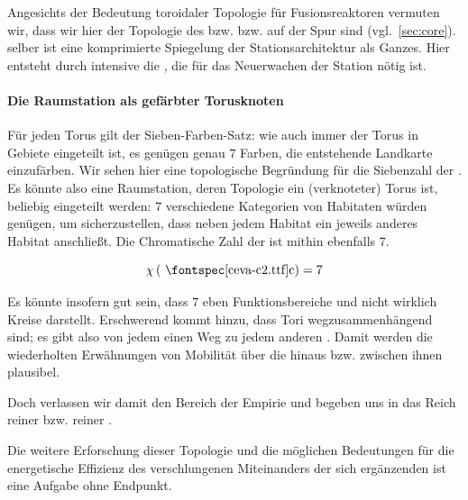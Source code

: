 Angesichts der Bedeutung toroidaler Topologie für Fusionsreaktoren vermuten wir, dass wir hier der Topologie des  bzw.  bzw.   auf der Spur sind (vgl.~\cref{sec:core}).  selber ist eine komprimierte Spiegelung der Stationsarchitektur als Ganzes. Hier entsteht durch intensive  die , die für das Neuerwachen der Station nötig ist.

\paragraph{Die Raumstation als gefärbter Torusknoten}

Für jeden Torus gilt der Sieben-Farben-Satz: wie auch immer der Torus in Gebiete eingeteilt ist, es genügen genau $7$ Farben, die entstehende Landkarte einzufärben. Wir sehen hier eine topologische Begründung für die Siebenzahl der . Es könnte also eine Raumstation, deren Topologie ein (verknoteter) Torus ist, beliebig eingeteilt werden: $7$ verschiedene Kategorien von Habitaten würden genügen, um sicherzustellen, dass neben jedem Habitat ein jeweils anderes Habitat anschließt. Die Chromatische Zahl der  ist mithin ebenfalls $7$.

\begin{equation}\label{eq:chromazahl}
    \chi\left( \text{\ceva{c}}
    \right) = 7
\end{equation}

Es könnte insofern gut sein, dass $7$  eben Funktionsbereiche und nicht wirklich Kreise darstellt. 
Erschwerend kommt hinzu, dass Tori wegzusammenhängend sind; es gibt also von jedem  einen Weg zu jedem anderen . Damit werden die wiederholten Erwähnungen von Mobilität über die  hinaus bzw. zwischen ihnen plausibel.

Doch verlassen wir damit den Bereich der Empirie und begeben uns in das Reich reiner  bzw. reiner .

Die weitere Erforschung dieser Topologie und die möglichen Bedeutungen für die energetische Effizienz des verschlungenen Miteinanders der sich ergänzenden  ist eine Aufgabe ohne Endpunkt.



    
